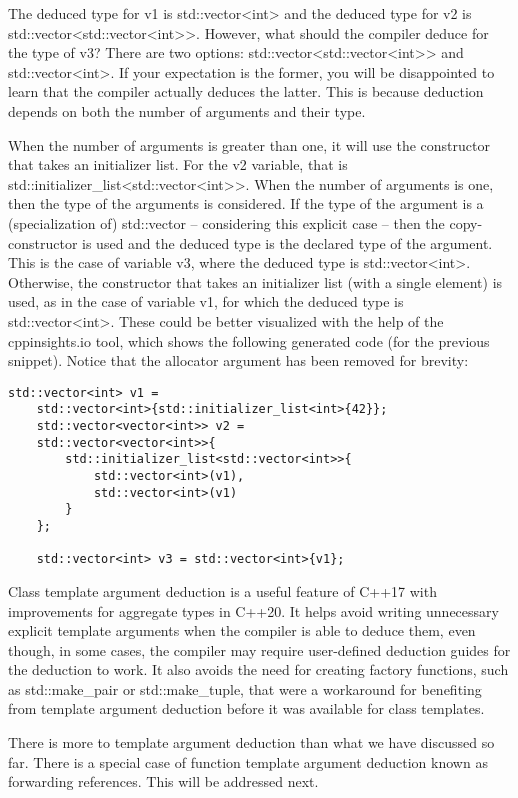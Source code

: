 The deduced type for v1 is std::vector<int> and the deduced type for v2 is std::vector<std::vector<int>>. However, what should the compiler deduce for the type of v3? There are two options: std::vector<std::vector<int>> and std::vector<int>. If your expectation is the former, you will be disappointed to learn that the compiler actually deduces the latter. This is because deduction depends on both the number of arguments and their type.

When the number of arguments is greater than one, it will use the constructor that takes an initializer list. For the v2 variable, that is std::initializer\_list<std::vector<int>>. When the number of arguments is one, then the type of the arguments is considered. If the type of the argument is a (specialization of) std::vector – considering this explicit case – then the copy-constructor is used and the deduced type is the declared type of the argument. This is the case of variable v3, where the deduced type is std::vector<int>. Otherwise, the constructor that takes an initializer list (with a single element) is used, as in the case of variable v1, for which the deduced type is std::vector<int>. These could be better visualized with the help of the cppinsights.io tool, which shows the following generated code (for the previous snippet). Notice that the allocator argument has been removed for brevity:

\begin{lstlisting}[style=styleCXX]
	std::vector<int> v1 =
	std::vector<int>{std::initializer_list<int>{42}};
	std::vector<vector<int>> v2 =
	std::vector<vector<int>>{
		std::initializer_list<std::vector<int>>{
			std::vector<int>(v1),
			std::vector<int>(v1)
		}
	};
	
	std::vector<int> v3 = std::vector<int>{v1};
\end{lstlisting}

Class template argument deduction is a useful feature of C++17 with improvements for aggregate types in C++20. It helps avoid writing unnecessary explicit template arguments when the compiler is able to deduce them, even though, in some cases, the compiler may require user-defined deduction guides for the deduction to work. It also avoids the need for creating factory functions, such as std::make\_pair or std::make\_tuple, that were a workaround for benefiting from template argument deduction before it was available for class templates.

There is more to template argument deduction than what we have discussed so far. There is a special case of function template argument deduction known as forwarding references. This will be addressed next.







